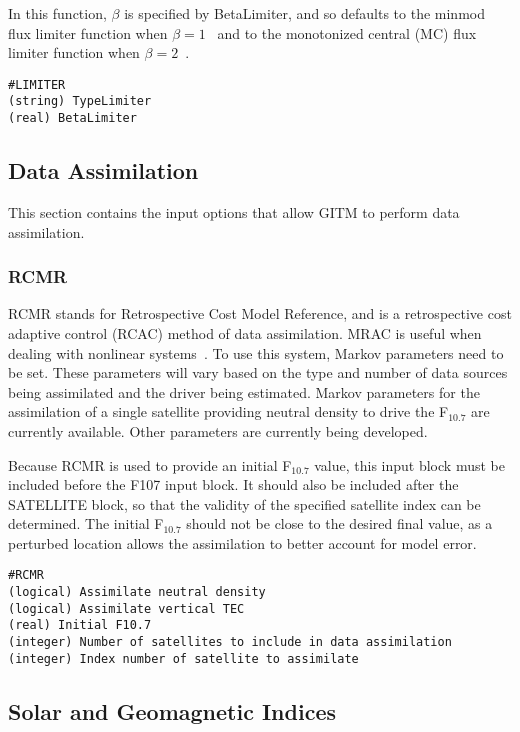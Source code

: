 In this function, $\beta$ is specified by BetaLimiter, and so defaults to the minmod flux limiter function when $\beta = 1$~\citep{roe:1986aa} and to the monotonized central (MC) flux limiter function when $\beta = 2$~\citep{valLeer:1977aa}.

\begin{verbatim}
#LIMITER
(string) TypeLimiter
(real) BetaLimiter
\end{verbatim}

\subsection{Data Assimilation}
\label{assim.sec}

This section contains the input options that allow GITM to perform data assimilation.

\subsubsection{RCMR}
\label{rcmr.sec}

RCMR stands for Retrospective Cost Model Reference, and is a retrospective cost adaptive control (RCAC) method of data assimilation.  MRAC is useful when dealing with nonlinear systems~\citep{Ali:2012aa}.  To use this system, Markov parameters need to be set.  These parameters will vary based on the type and number of data sources being assimilated and the driver being estimated.  Markov parameters for the assimilation of a single satellite providing neutral density to drive the F$_{10.7}$ are currently available.  Other parameters are currently being developed.

Because RCMR is used to provide an initial F$_{10.7}$ value, this input block must be included before the F107 input block.  It should also be included after the SATELLITE block, so that the validity of the specified satellite index can be determined.  The initial F$_{10.7}$ should not be close to the desired final value, as a perturbed location allows the assimilation to better account for model error.

\begin{verbatim}
#RCMR
(logical) Assimilate neutral density
(logical) Assimilate vertical TEC
(real) Initial F10.7
(integer) Number of satellites to include in data assimilation
(integer) Index number of satellite to assimilate
\end{verbatim}

\subsection{Solar and Geomagnetic Indices}
\label{indices.sec}

